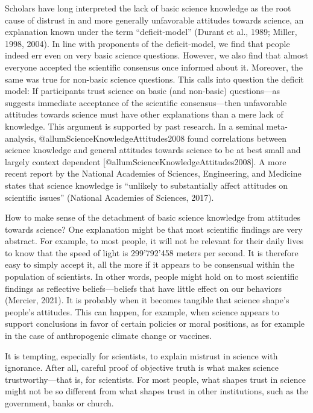 \documentclass[
  doc,floatsintext]{apa6}
\begin{document}
Scholars have long interpreted the lack of basic science knowledge as the root cause of distrust in and more generally unfavorable attitudes towards science, an explanation known under the term ``deficit-model'' (Durant et al., 1989; Miller, 1998, 2004). In line with proponents of the deficit-model, we find that people indeed err even on very basic science questions. However, we also find that almost everyone accepted the scientific consensus once informed about it. Moreover, the same was true for non-basic science questions. This calls into question the deficit model: If participants trust science on basic (and non-basic) questions---as suggests immediate acceptance of the scientific consensus---then unfavorable attitudes towards science must have other explanations than a mere lack of knowledge. This argument is supported by past research. In a seminal meta-analysis, @allumScienceKnowledgeAttitudes2008 found correlations between science knowledge and general attitudes towards science to be at best small and largely context dependent {[}@allumScienceKnowledgeAttitudes2008{]}. A more recent report by the National Academies of Sciences, Engineering, and Medicine states that science knowledge is ``unlikely to substantially affect attitudes on scientific issues'' (National Academies of Sciences, 2017).

How to make sense of the detachment of basic science knowledge from attitudes towards science? One explanation might be that most scientific findings are very abstract. For example, to most people, it will not be relevant for their daily lives to know that the speed of light is 299'792'458 meters per second. It is therefore easy to simply accept it, all the more if it appears to be consensual within the population of scientists. In other words, people might hold on to most scientific findings as reflective beliefs---beliefs that have little effect on our behaviors (Mercier, 2021). It is probably when it becomes tangible that science shape's people's attitudes. This can happen, for example, when science appears to support conclusions in favor of certain policies or moral positions, as for example in the case of anthropogenic climate change or vaccines.

It is tempting, especially for scientists, to explain mistrust in science with ignorance. After all, careful proof of objective truth is what makes science trustworthy---that is, for scientists. For most people, what shapes trust in science might not be so different from what shapes trust in other institutions, such as the government, banks or church.
\end{document}
